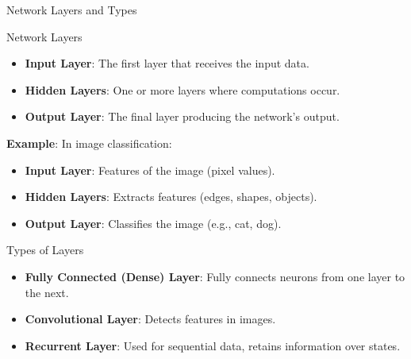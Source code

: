 \documentclass[aspectratio=169]{beamer}
\begin{document}
\begin{frame}[fragile]{Network Layers and Types}
  \begin{block}{Network Layers}
    \begin{itemize}
      \item \textbf{Input Layer}: The first layer that receives the input data.
      \item \textbf{Hidden Layers}: One or more layers where computations occur.
      \item \textbf{Output Layer}: The final layer producing the network's output.
    \end{itemize}
    
    \textbf{Example}: In image classification:
    \begin{itemize}
      \item \textbf{Input Layer}: Features of the image (pixel values).
      \item \textbf{Hidden Layers}: Extracts features (edges, shapes, objects).
      \item \textbf{Output Layer}: Classifies the image (e.g., cat, dog).
    \end{itemize}
  \end{block}

  \begin{block}{Types of Layers}
    \begin{itemize}
      \item \textbf{Fully Connected (Dense) Layer}: Fully connects neurons from one layer to the next.
      \item \textbf{Convolutional Layer}: Detects features in images.
      \item \textbf{Recurrent Layer}: Used for sequential data, retains information over states.
    \end{itemize}
  \end{block}
\end{frame}
\end{document}
